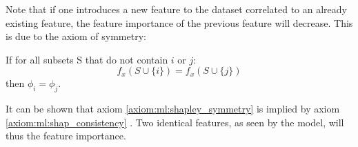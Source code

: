 Note that if one introduces a new feature to the dataset correlated to an already existing feature, the feature importance of the previous feature will decrease. 
This is due to the axiom of symmetry:
\begin{axiom}[Symmetry]
  \label{axiom:ml:shapley_symmetry}
  If for all subsets S that do not contain $i$ or $j$: 
  \begin{equation}
    f_x(S \cup \{i\}) = f_x(S \cup \{j\})
  \end{equation}
  then $\phi_i = \phi_j$.
\end{axiom}
It can be shown that axiom \ref{axiom:ml:shapley_symmetry} is implied by axiom \ref{axiom:ml:shap_consistency}  \citep[Supp. Material]{Lundberg:2017}. Two identical features, as seen by the model, will thus  the feature importance.
